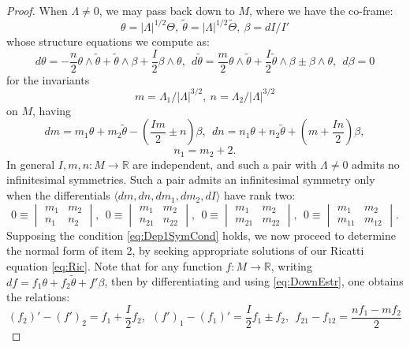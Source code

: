 \documentclass[10pt,a4paper]{amsart}
\newcommand{\R}{\mathbb{R}}
\begin{document}
\begin{proof}
     When $\Lambda\ne 0$, we may pass back down to $M$, where we have the co-frame:
\[ \theta = |\Lambda|^{1/2}\Theta, ~\tilde\theta = |\Lambda|^{1/2} \tilde\Theta, ~\beta = dI/I' \]
whose structure equations we compute as:
\begin{equation}\label{eq:DownEstr}
 d\theta = - \frac{n}{2}\theta\wedge\tilde\theta + \tilde\theta\wedge\beta + \frac{I}{2} \beta\wedge\theta, ~~d\tilde\theta = \frac{m}{2} \theta\wedge\tilde\theta + \frac{I}{2}\tilde\theta\wedge\beta \pm \beta \wedge \theta,~~
d\beta = 0
\end{equation}
for the invariants
\[ m = \Lambda_1/|\Lambda|^{3/2}, ~n = \Lambda_2/|\Lambda|^{3/2} \]
on $M$, having
\[ dm = m_1\theta + m_2\tilde\theta -  \left( \frac{Im}{2} \pm n\right)\beta, ~~ dn = n_1 \theta + n_2 \tilde\theta + \left( m + \frac{In}{2} \right)\beta,  \]
\[n_1 = m_2 + 2. \]
In general $I, m,n:M\to \R$ are independent, and such a pair with $\Lambda\ne 0$ admits no infinitesimal symmetries.  Such a pair admits an infinitesimal symmetry only when the differentials $\langle dm, dn, dm_1, dm_2, dI\rangle$ have rank two:
\begin{equation}\label{eq:Dep1SymCond}
    0 \equiv \begin{vmatrix}
    m_1 & m_2 \\ n_1 & n_2
\end{vmatrix},  ~~0 \equiv \begin{vmatrix}
    m_1 & m_2 \\ n_{21} & n_{22}
\end{vmatrix}, ~~0 \equiv \begin{vmatrix}
    m_1 & m_2 \\ m_{21} & m_{22}
\end{vmatrix}, ~~0 \equiv \begin{vmatrix}
    m_1 & m_2 \\ m_{11} & m_{12}
\end{vmatrix}.
\end{equation}
Supposing the condition \eqref{eq:Dep1SymCond} holds, we now proceed to determine the normal form of item 2, by seeking appropriate solutions of our Ricatti equation \eqref{eq:Ric}. Note that for any function $f:M\to \R$, writing $df = f_1\theta + f_2\tilde\theta + f'\beta$, then by differentiating and using \eqref{eq:DownEstr}, one obtains the relations:
\begin{equation}\label{eq:Dep1SymDerivs}
    (f_2)' - (f')_2 = f_1 + \frac{I}{2} f_2, ~~ (f')_1 - (f_1)'  =  \frac{I}{2}f_1 \pm f_2 , ~~ f_{21} - f_{12} = \frac{nf_1 - mf_2}{2}

\end{equation}
\end{proof}
\end{document}
